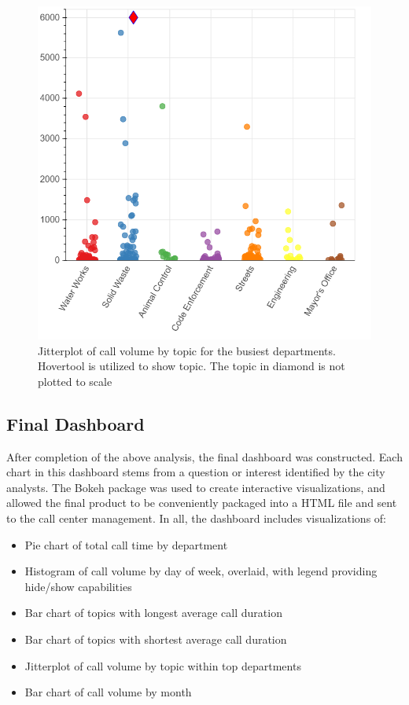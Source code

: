 \documentclass[11pt,twocolumn]{article}
\begin{document}
\begin{figure}[h]
  \includegraphics[scale=0.25]{jitterplot.png}
  \caption{Jitterplot of call volume by topic for the busiest departments.  Hovertool is utilized to show topic.  The topic in diamond is not plotted to scale}
\end{figure}

	\subsection{Final Dashboard}

After completion of the above analysis, the final dashboard was constructed.  Each chart in this dashboard stems from a question or interest identified by the city analysts.  The Bokeh package was used to create interactive visualizations, and allowed the final product to be conveniently packaged into a HTML file and sent to the call center management.  In all, the dashboard includes visualizations of:

\begin{itemize}
  \item{Pie chart of total call time by department}
  \item{Histogram of call volume by day of week, overlaid, with legend providing hide/show capabilities}
  \item{Bar chart of topics with longest average call duration}
  \item{Bar chart of topics with shortest average call duration}
  \item{Jitterplot of call volume by topic within top departments}
  \item{Bar chart of call volume by month}
\end{itemize}
\end{document}
